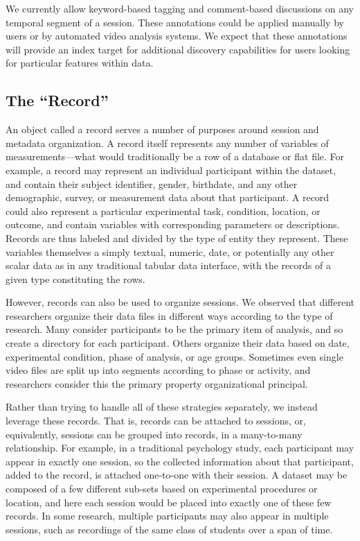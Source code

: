 \documentclass{sig-alternate}
\begin{document}
We currently allow keyword-based tagging and comment-based discussions on any temporal segment of a session.
These annotations could be applied manually by users or by automated video analysis systems.
We expect that these annotations will provide an index target for additional discovery capabilities for users looking for particular features within data.

\subsection{The ``Record''}

An object called a record serves a number of purposes around session and metadata organization.
A record itself represents any number of variables of measurements---what would traditionally be a row of a database or flat file.
For example, a record may represent an individual participant within the dataset, and contain their subject identifier, gender, birthdate, and any other demographic, survey, or measurement data about that participant.
A record could also represent a particular experimental task, condition, location, or outcome, and contain variables with corresponding parameters or descriptions.
Records are thus labeled and divided by the type of entity they represent.
These variables themselves a simply textual, numeric, date, or potentially any other scalar data as in any traditional tabular data interface, with the records of a given type constituting the rows.

However, records can also be used to organize sessions.
We observed that different researchers organize their data files in different ways according to the type of research.
Many consider participants to be the primary item of analysis, and so create a directory for each participant.
Others organize their data based on date, experimental condition, phase of analysis, or age groups.
Sometimes even single video files are split up into segments according to phase or activity, and researchers consider this the primary property organizational principal.

Rather than trying to handle all of these strategies separately, we instead leverage these records.
That is, records can be attached to sessions, or, equivalently, sessions can be grouped into records, in a many-to-many relationship.
For example, in a traditional psychology study, each participant may appear in exactly one session, so the collected information about that participant, added to the record, is attached one-to-one with their session.
A dataset may be composed of a few different sub-sets based on experimental procedures or location, and here each session would be placed into exactly one of these few records.
In some research, multiple participants may also appear in multiple sessions, such as recordings of the same class of students over a span of time.
\end{document}
